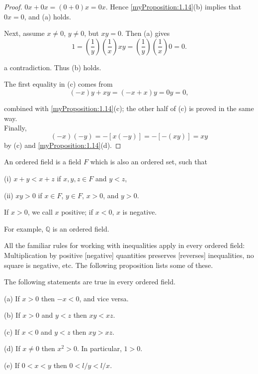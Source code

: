 \begin{proof}
    $0x+0x=(0+0)x=0x$. Hence \ref{myProposition:1.14}(b) implies that $0x=0$, and (a) holds.

    Next, assume $x \neq 0$, $y \neq 0$, but $xy =0$. Then (a) gives
    \begin{equation*}
        1=
        \left(\frac{1}{y}\right)\left(\frac{1}{x}\right)xy=
        \left(\frac{1}{y}\right)\left(\frac{1}{x}\right)0=0.
    \end{equation*}

a contradiction. Thus (b) holds.

The first equality in (c) comes from
\begin{equation*}
    (-x)y +xy=(-x+x)y=0y=0,
\end{equation*}

combined with \ref{myProposition:1.14}(c); the other half of (c) is proved in the same way.\\
Finally,
\begin{equation*}
    (-x)(-y)=-[x(-y)]=-[-(xy)]=xy
\end{equation*}
by (c) and \ref{myProposition:1.14}(d).
\end{proof}

\begin{myDefinition}\label{myDefinition:1.17}
    An ordered field is a field $F$ which is also an ordered set, such
    that
    
    (i) $x+y<x+z$ if $x,y,z\in F$ and $y<z$,
    
    (ii) $xy>0$ if $x\in F$, $y\in F$, $x>0$, and $y>0$.
\end{myDefinition}
If $x > 0$, we call $x$ positive; 
if $x < 0$, $x$ is negative.

For example, $\mathbb{Q}$ is an ordered field.

All the familiar rules for working with inequalities apply in every ordered
field: Multiplication by positive [negative] quantities preserves [reverses] inequalities, no square is negative, etc. The following proposition lists some of
these.


\begin{myProposition}\label{myProposition:1.18}
    The following statements are true in every ordered field.

(a) If $x>0$ then $-x <0$, and vice versa.

(b) If $x>0$ and $y<z$ then $xy <xz$.

(c) If $x<0$ and $y<z$ then $xy> xz$.

(d) If $x \neq 0$ then $x^2 > 0$. In particular, $1 > 0$.

(e) If $0<x<y$ then $0<l/y<l/x$.
\end{myProposition}

